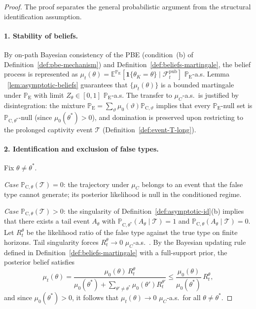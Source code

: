 \documentclass[12pt]{article}
\numberwithin{equation}{section}
\numberwithin{table}{section}
\theoremstyle{definition}
\newcommand{\E}{\mathbb{E}}
\newcommand{\ProbE}{\mathbb{P}_{\mathrm{E}}}
\newcommand{\ProbC}[1]{\mathbb{P}_{\mathrm{C},#1}}
\begin{document}
\begin{proof}
The proof separates the general probabilistic argument from the structural
identification assumption.

\paragraph{1. Stability of beliefs.}
By on-path Bayesian consistency of the PBE (condition~(b) of Definition~\ref{def:pbe-mechanism}) and Definition~\ref{def:beliefs-martingale}, the belief process is represented as
$\mu_t(\theta)=\E^{\ProbE}[\mathbf{1}\{\theta_K=\theta\}\mid
\mathcal{F}_t^{\mathrm{pub}}]$ $\ProbE$-a.s. Lemma
~\ref{lem:asymptotic-beliefs} guarantees that $\{\mu_t(\theta)\}$ is a
bounded martingale under $\ProbE$ with limit $Z_\theta\in[0,1]$ $\ProbE$-a.s. The
transfer to $\mu_C$-a.s.\ is justified by disintegration: the mixture
$\ProbE=\sum_\vartheta\mu_0(\vartheta)\ProbC{\vartheta}$ implies that every
$\ProbE$-null set is $\ProbC{\theta^\ast}$-null (since
$\mu_0(\theta^\ast)>0$), and domination is preserved upon restricting to
the prolonged captivity event $\mathcal{T}$ (Definition~\ref{def:event-T-long}).

\paragraph{2. Identification and exclusion of false types.}
Fix $\theta\neq\theta^\ast$.

\emph{Case} $\ProbC{\theta}(\mathcal{T})=0$: the trajectory under $\mu_C$
belongs to an event that the false type cannot generate; its posterior
likelihood is null in the conditioned regime.

\emph{Case} $\ProbC{\theta}(\mathcal{T})>0$: the singularity of
Definition~\ref{def:asymptotic-id}(b) implies that there exists a tail event
$A_\theta$ with
$\ProbC{\theta^\ast}(A_\theta\mid\mathcal{T})=1$ and
$\ProbC{\theta}(A_\theta\mid\mathcal{T})=0$.
Let $R_t^\theta$ be the likelihood ratio of the false type against the true
type on finite horizons. Tail singularity forces
$R_t^\theta\to 0$ $\mu_C$-a.s.\
\citep{BlackwellDubins1962,Schervish1995Theory}.
By the Bayesian updating rule defined in Definition~\ref{def:beliefs-martingale} with a full-support prior, the posterior belief satisfies
\[
\mu_t(\theta)
=\frac{\mu_0(\theta)\,R_t^\theta}
      {\mu_0(\theta^\ast)+\sum_{\theta'\neq\theta^\ast}\mu_0(\theta')R_t^{\theta'}}
\le\frac{\mu_0(\theta)}{\mu_0(\theta^\ast)}\,R_t^\theta,
\]
and since $\mu_0(\theta^\ast)>0$, it follows that
$\mu_t(\theta)\to 0$ $\mu_C$-a.s.\ for all $\theta\neq\theta^\ast$.


\end{proof}
\end{document}
